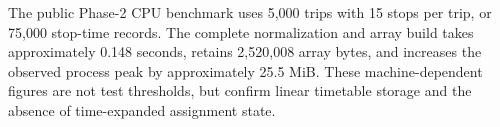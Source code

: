 The public Phase-2 CPU benchmark uses 5,000 trips with 15 stops per trip, or
75,000 stop-time records.  The complete normalization and array build takes
approximately 0.148 seconds, retains 2,520,008 array bytes, and increases the
observed process peak by approximately 25.5 MiB.  These machine-dependent
figures are not test thresholds, but confirm linear timetable storage and the
absence of time-expanded assignment state.


